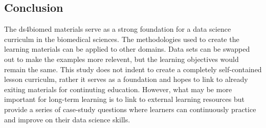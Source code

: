 \documentclass[030-workshop.tex]{subfiles}
\begin{document}
    \subsection{Conclusion}

        The ds4biomed materials serve as a strong foundation for a data science curriculm in the biomedical sciences.
        The methodologies used to create the learning materials can be applied to other domains.
        Data sets can be swapped out to make the examples more relevent,
        but the learning objectives would remain the same.
        This study does not indent to create a completely self-contained lesson curriculm,
        rather it serves as a foundation and hopes to link to already exiting materials for continuting education.
        However, what may be more important for long-term learning
        is to link to external learning resources but provide a series of case-study questions
        where learners can continuously practice and improve on their data science skills.
\end{document}
